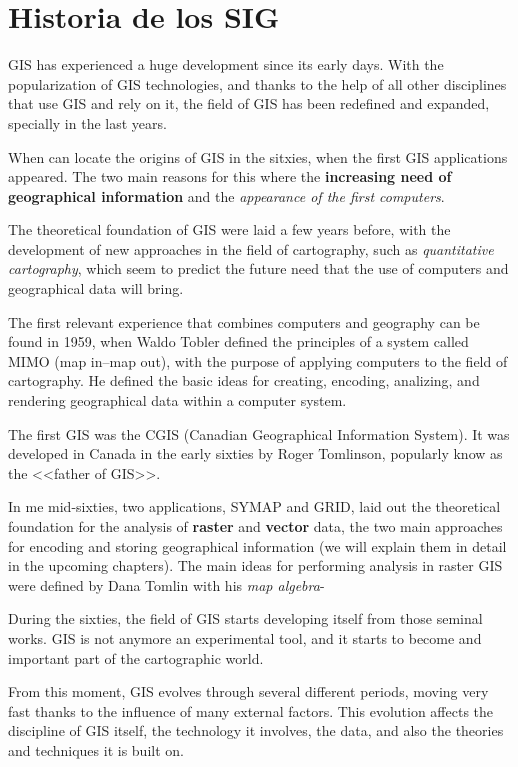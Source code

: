 
\chapter{Historia de los SIG}


\pagestyle{fancy}

GIS has experienced a huge development since its early days. With the popularization of GIS technologies, and thanks to the help of all other disciplines that use GIS and rely on it, the field of GIS has been redefined and expanded, specially in the last years.

When can locate the origins of GIS in the sitxies, when the first GIS applications appeared. The two main reasons for this where the \textbf{increasing need of geographical information} and the \emph{appearance of the first computers}.

The theoretical foundation of GIS were laid a few years before, with the development of new approaches in the field of cartography, such as \emph{quantitative cartography}, which seem to predict the future need that the use of computers and geographical data will bring.

The first relevant experience that combines computers and geography can be found in 1959, when Waldo Tobler defined the principles of a system called MIMO (map in--map out), with the purpose of applying computers to the field of cartography. He defined the basic ideas for creating, encoding, analizing, and rendering geographical data within a computer system.

The first GIS was the CGIS (Canadian Geographical Information System). It was developed in Canada in the early sixties by Roger Tomlinson, popularly know as the <<father of GIS>>.

In me mid-sixties, two applications, SYMAP and GRID, laid out the theoretical foundation for the analysis of \textbf{raster} and \textbf{vector} data, the two main approaches for encoding and storing geographical information (we will explain them in detail in the upcoming chapters). The main ideas for performing analysis in raster GIS were defined by Dana Tomlin with his \emph{map algebra}-

During the sixties, the field of GIS starts developing itself from those seminal works. GIS is not anymore an experimental tool, and it starts to become and important part of the cartographic world.

From this moment, GIS evolves through several different periods, moving very fast thanks to the influence of many external factors. This evolution affects the discipline of GIS itself, the technology it involves, the data, and also the theories and techniques it is built on.



